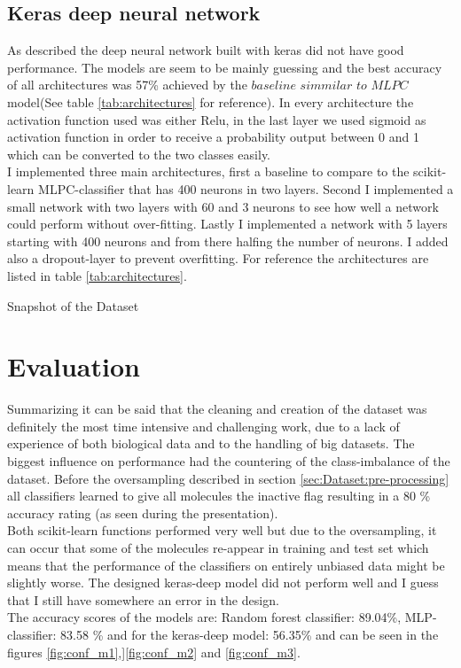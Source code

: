 \documentclass[12pt]{article}
\begin{document}
\subsection{Keras deep neural network}
\label{sec:architectures:Keras-deep-model}
As described the deep neural network built with keras did not have good performance. The models are seem to be mainly guessing and the best accuracy of all architectures was 57\% achieved by the $\textit{baseline simmilar to MLPC}$ model(See table \ref{tab:architectures} for reference).
In every architecture the activation function used was either Relu, in the last layer we used sigmoid as activation function in order to receive a probability output between 0 and 1 which can be converted to the two classes easily.\\
I implemented three main architectures, first a baseline to compare to the scikit-learn MLPC-classifier that has 400 neurons in two layers. Second I implemented a small network with two layers with 60 and 3 neurons to see how well a network could perform without over-fitting. Lastly I implemented a network with 5 layers starting with 400 neurons and from there halfing the number of neurons. I added also a dropout-layer to prevent overfitting. For reference the architectures are listed in table \ref{tab:architectures}.
 
\begin{table}[t]
\centering

\caption{Snapshot of the Dataset}
\label{tab:architectures}
\end{table}

\section{Evaluation}\label{sec:Evaluation}
Summarizing it can be said that the cleaning and creation of the dataset was definitely the most time intensive and challenging work, due to a lack of experience of both biological data and to the handling of big datasets. The biggest influence on performance had the countering of the class-imbalance of the dataset. Before the oversampling described in section \ref{sec:Dataset:pre-processing} all classifiers learned to give all molecules the inactive flag resulting in a 80 \% accuracy rating (as seen during the presentation).\\ Both scikit-learn functions performed very well but due to the oversampling, it can occur that some of the molecules re-appear in training and test set which means that the performance of the classifiers on entirely unbiased data might be slightly worse. The designed keras-deep model did not perform well and I guess that I still have somewhere an error in the design.\\ The accuracy scores of the models are: Random forest classifier: 89.04\%, MLP-classifier: 83.58 \% and for the keras-deep model: 56.35\% and can be seen in the figures \ref{fig:conf_m1},]\ref{fig:conf_m2} and \ref{fig:conf_m3}.
\end{document}
